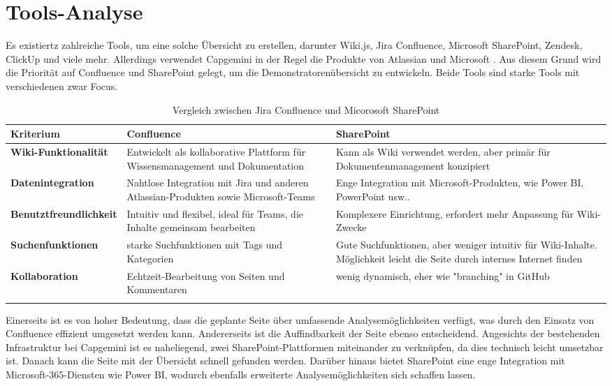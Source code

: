 \section{Tools-Analyse}%
Es existiertz zahlreiche Tools, um eine solche Übersicht zu erstellen, darunter Wiki.js, Jira Confluence, Microsoft SharePoint, Zendesk, ClickUp und viele mehr. Allerdings verwendet Capgemini in der Regel die Produkte von Atlassian und Microsoft . Aus diesem Grund wird die Priorität auf Confluence\cite{Confluence} und SharePoint\cite{SharePoint} gelegt, um die Demonstratorenübersicht zu entwickeln. Beide Tools sind starke Tools mit verschiedenen zwar Focus.
\newpage
\begin{longtable}{|p{4.5cm}|p{5.5cm}|p{5.5cm}|}
	\hline
	\textbf{Kriterium} & \textbf{Confluence} & \textbf{SharePoint} \\ \hline
	\textbf{Wiki-Funktionalität} & Entwickelt als kollaborative Plattform für Wissensmanagement und Dokumentation & Kann als Wiki verwendet werden, aber primär für Dokumentenmanagement konzipiert \\ \hline
	\textbf{Datenintegration} & Nahtlose Integration mit Jira und anderen Atlassian-Produkten sowie Microsoft-Teams & Enge Integration mit Microsoft-Produkten, wie Power BI, PowerPoint usw..\\ \hline
	\textbf{Benutztfreundlichkeit} & Intuitiv und flexibel, ideal für Teams, die Inhalte gemeinsam bearbeiten & Komplexere Einrichtung, erfordert mehr Anpassung für Wiki-Zwecke\\ \hline
	\textbf{Suchenfunktionen} &starke Suchfunktionen mit Tags und Kategorien & Gute Suchfunktionen, aber weniger intuitiv für Wiki-Inhalte. Möglichkeit leicht die Seite durch internes Internet finden  \\ \hline
	\textbf{Kollaboration} &Echtzeit-Bearbeitung von Seiten und Kommentaren & wenig dynamisch, eher wie "branching" in GitHub \\ \hline
	\caption{Vergleich zwischen Jira Confluence und Micorosoft SharePoint}
\end{longtable}
Einerseits ist es von hoher Bedeutung, dass die geplante Seite über umfassende Analysemöglichkeiten verfügt, was durch den Einsatz von Confluence effizient umgesetzt werden kann. Andererseits ist die Auffindbarkeit der Seite ebenso entscheidend. Angesichts der bestehenden Infrastruktur bei Capgemini ist es naheliegend, zwei SharePoint-Plattformen miteinander zu verknüpfen, da dies technisch leicht umsetzbar ist. Danach kann die Seite mit der Übersicht schnell gefunden werden. Darüber hinaus bietet SharePoint eine enge Integration mit Microsoft-365-Diensten wie Power BI, wodurch ebenfalls erweiterte Analysemöglichkeiten sich schaffen lassen.
